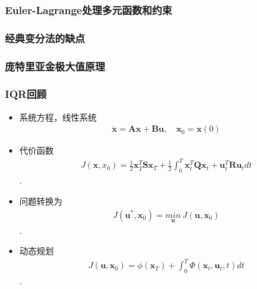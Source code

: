 \documentclass[UTF8, aspectratio=169, 10pt]{ctexbeamer}
\begin{document}
\begin{frame}
  \frametitle{Euler-Lagrange处理多元函数和约束}
  
\end{frame}

\begin{frame}
  \frametitle{经典变分法的缺点}
  
\end{frame}

\begin{frame}
  \frametitle{庞特里亚金极大值原理}
\end{frame}

\begin{frame}
  \frametitle{IQR回顾}
  
  \begin{itemize}
  \item 系统方程，线性系统
    \begin{align}
      \dot{ \boldsymbol{ x } } = \boldsymbol{ A x } + \boldsymbol{ B u }, \quad
      \boldsymbol{x}_0 = \boldsymbol{x}(0)
    \end{align}
    
  \item 代价函数
    \begin{align}
      J(\boldsymbol{x}, x_0) = \frac{1}{2} \boldsymbol{x}^T_T \boldsymbol{S}
      \boldsymbol{ x }_T + \frac{1}{2} \int_0^T \boldsymbol{x}^T_t
      \boldsymbol{Q} \boldsymbol{x}_t + \boldsymbol{u}^T_t \boldsymbol{R}
      \boldsymbol{u}_t dt
    \end{align}.
    
  \item 问题转换为
    \begin{align}
      J( \boldsymbol{u}^{*}, \boldsymbol{x}_0 ) = \underset{ \boldsymbol{u}
      }{min}  \, J(
      \boldsymbol{u}, \boldsymbol{x}_0 )
    \end{align}.
    
  \item 动态规划
    \begin{align}
       J( \boldsymbol{u}, \boldsymbol{x}_0 ) = \phi( \boldsymbol{x}_{T} ) + \int_0^T
      \Phi( \boldsymbol{x}_t,  \boldsymbol{u}_t, t ) dt
    \end{align}.
        
  \end{itemize}
\end{frame}
\end{document}
